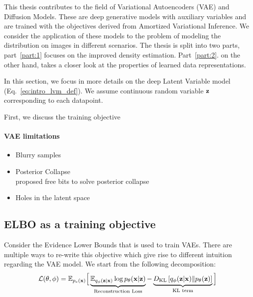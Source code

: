 This thesis contributes to the field of Variational Autoencoders (VAE) and Diffusion Models. These are deep generative models with auxiliary variables and are trained with the objectives derived from Amortized Variational Inference. We consider the application of these models to the problem of modeling the distribution on images in different scenarios. The thesis is split into two parts, part~\ref{part:1} focuses on the improved density estimation. Part~\ref{part:2}. on the other hand, takes a closer look at the properties of learned data representations. 

In this section, we focus in more details on the deep Latent Variable model (Eq.~\ref{eq:intro_lvm_def}). We assume  continuous random variable ${\mathbf{z}}$ corresponding to each datapoint. 

First, we discuss the training objective



\paragraph{VAE limitations}
\begin{itemize}
    \item Blurry samples \cite{Rybkin2020-je}
    \item Posterior Collapse \\
    \cite{kingma2016improved} proposed free bits to solve posterior collapse    
    \item Holes in the latent space
\end{itemize}



\subsection{ELBO as a training objective}

Consider the Evidence Lower Bounds that is used to train VAEs. There are multiple ways to re-write this objective which give rise to different intuition regarding the VAE model. We start from the following decomposition:
\begin{equation}\label{eq:intro_elbo_again}
\mathcal{L}(\theta, \phi) = \E_{p_e(\rvx)}\Big[ \underbrace{\E_{q_{\phi}(\rvz|\rvx)} \log p_{\theta}(\rvx| \rvz)}_{\text{Reconstruction Loss}} - \underbrace{\KL{q_{\phi}(\rvz|\rvx)}{p_{\theta}(\rvz)}}_{\text{KL term}} \Big]%
\end{equation}

